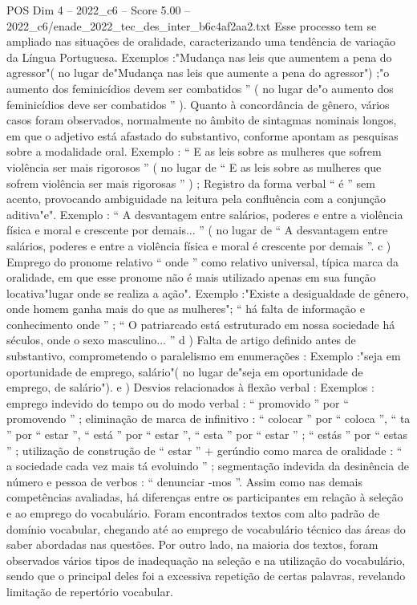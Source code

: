 \begin{textsample}{POS Dim 4 – 2022\_c6 – Score 5.00 – 2022\_c6/enade\_2022\_tec\_des\_inter\_b6c4af2aa2.txt}
Esse processo tem se ampliado nas situações de oralidade, caracterizando uma tendência de variação da Língua Portuguesa.
Exemplos :"Mudança nas leis que aumentem a pena do agressor"( no lugar de"Mudança nas leis que aumente a pena do agressor") ;"o aumento dos feminicídios devem ser combatidos ” ( no lugar de"o aumento dos feminicídios deve ser combatidos ” ).
Quanto à concordância de gênero, vários casos foram observados, normalmente no âmbito de sintagmas nominais longos, em que o adjetivo está afastado do substantivo, conforme apontam as pesquisas sobre a modalidade oral.
Exemplo : “ E as leis sobre as mulheres que sofrem violência ser mais rigorosos ” ( no lugar de “ E as leis sobre as mulheres que sofrem violência ser mais rigorosas ” ) ; Registro da forma verbal “ é ” sem acento, provocando ambiguidade na leitura pela confluência com a conjunção aditiva"e".
Exemplo : “ A desvantagem entre salários, poderes e entre a violência física e moral e crescente por demais... ” ( no lugar de “ A desvantagem entre salários, poderes e entre a violência física e moral é crescente por demais ”. c ) Emprego do pronome relativo “ onde ” como relativo universal, típica marca da oralidade, em que esse pronome não é mais utilizado apenas em sua função locativa"lugar onde se realiza a ação".
Exemplo :"Existe a desigualdade de gênero, onde homem ganha mais do que as mulheres"; “ há falta de informação e conhecimento onde ” ; “ O patriarcado está estruturado em nossa sociedade há séculos, onde o sexo masculino... ” d ) Falta de artigo definido antes de substantivo, comprometendo o paralelismo em enumerações : Exemplo :"seja em oportunidade de emprego, salário"( no lugar de"seja em oportunidade de emprego, de salário"). e ) Desvios relacionados à flexão verbal : Exemplos : emprego indevido do tempo ou do modo verbal : “ promovido ” por “ promovendo ” ; eliminação de marca de infinitivo : “ colocar ” por “ coloca ”, “ ta ” por “ estar ”, “ está ” por “ estar ”, “ esta ” por “ estar ” ; “ estás ” por “ estas ” ; utilização de construção de “ estar ” + gerúndio como marca de oralidade : “ a sociedade cada vez mais tá evoluindo ” ; segmentação indevida da desinência de número e pessoa de verbos : “ denunciar -mos ”.
Assim como nas demais competências avaliadas, há diferenças entre os participantes em relação à seleção e ao emprego do vocabulário.
Foram encontrados textos com alto padrão de domínio vocabular, chegando até ao emprego de vocabulário técnico das áreas do saber abordadas nas questões.
Por outro lado, na maioria dos textos, foram observados vários tipos de inadequação na seleção e na utilização do vocabulário, sendo que o principal deles foi a excessiva repetição de certas palavras, revelando limitação de repertório vocabular.

\end{textsample}
